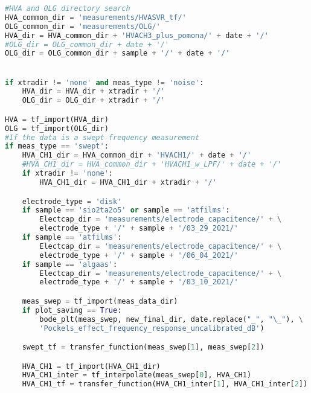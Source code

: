 \begin{lstlisting}[frame=single, language=Python]
#HVA and OLG directory search
HVA_common_dir = 'measurements/HVASVR_tf/'                             # HVA and OLG directories
OLG_common_dir = 'measurements/OLG/'
HVA_dir = HVA_common_dir + 'HVACH3_plus_pomona/' + date + '/'
#OLG_dir = OLG_common_dir + date + '/'
OLG_dir = OLG_common_dir + sample + '/' + date + '/'


if xtradir != 'none' and meas_type != 'noise':
    HVA_dir = HVA_dir + xtradir + '/'
    OLG_dir = OLG_dir + xtradir + '/'

HVA = tf_import(HVA_dir)                                                     # import the HVA and OLG data
OLG = tf_import(OLG_dir)
#If the data is a swept frequency measurement
if meas_type == 'swept':                                                     # import HVA CH1 transfer function data for transfer function measurement
    HVA_CH1_dir = HVA_common_dir + 'HVACH1/' + date + '/'
    #HVA_CH1_dir = HVA_common_dir + 'HVACH1_w_LPF/' + date + '/'
    if xtradir != 'none':
        HVA_CH1_dir = HVA_CH1_dir + xtradir + '/'

    electrode_type = 'disk'                                                  # import low pass measurement from resistor / electrode capacitence
    if sample == 'sio2ta2o5' or sample == 'atfilms':
        Electcap_dir = 'measurements/electrode_capacitence/' + \
        electrode_type + '/' + sample + '/03_29_2021/'
    if sample == 'atfilms':
        Electcap_dir = 'measurements/electrode_capacitence/' + \
        electrode_type + '/' + sample + '/06_04_2021/'
    if sample == 'algaas':
        Electcap_dir = 'measurements/electrode_capacitence/' + \
        electrode_type + '/' + sample + '/03_10_2021/'

    meas_swep = tf_import(meas_data_dir)                                     # import transfer function measurement
    if plot_saving == True:                                                  # plot uncalibrated transfer function measurement if requested
        bode_plt(meas_swep, new_final_dir, date.replace("_", "\_"), \
        'Pockels_effect_frequency_response_uncalibrated_dB')

    swept_tf = transfer_function(meas_swep[1], meas_swep[2])                 # combine amplitude and phase

    HVA_CH1 = tf_import(HVA_CH1_dir)                                         # HVA CH1 import and interpolation (interpolate to transfer function frequency vector)
    HVA_CH1_inter = tf_interpolate(meas_swep[0], HVA_CH1)
    HVA_CH1_tf = transfer_function(HVA_CH1_inter[1], HVA_CH1_inter[2])


\end{lstlisting}
